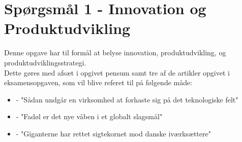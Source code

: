 \section{Spørgsmål 1 - Innovation og Produktudvikling}
Denne opgave har til formål at belyse innovation, produktudvikling, og produktudviklingsstrategi.\\
Dette gøres med afsæt i opgivet pensum samt tre af de artikler opgivet i eksamensopgaven, som vil blive
referet til på følgende måde:
\begin{itemize}
    \item \cite[a.1]{eksamensopgave} - "Sådan undgår en virksomhed at forhaste sig på det teknologiske felt"
    \item \cite[a.2]{eksamensopgave} - "Fadøl er det nye våben i et globalt slagsmål"
    \item \cite[a.3]{eksamensopgave} - "Giganterne har rettet sigtekornet mod danske iværksættere"
\end{itemize}

